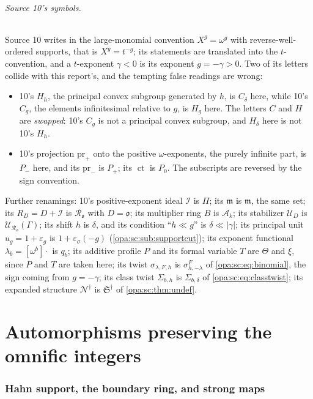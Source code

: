 \documentclass[11pt,oneside]{article}
\numberwithin{equation}{section}
\theoremstyle{definition}
\theoremstyle{remark}
\newcommand{\oo}{\mathfrak o}
\newcommand{\Ak}{\mathcal A_k}
\newcommand{\Ro}{\mathcal R_{\oo}}
\newcommand{\mm}{\mathfrak m}
\newcommand{\UU}{\mathcal U}
\newcommand{\ct}{\operatorname{ct}}
\newcommand{\bb}{\mathbin{\ll}}
\begin{document}
\paragraph{Source 10's symbols.} Source 10 writes in the large-monomial
convention $X^g=\omega^g$ with reverse-well-ordered supports, that is
$X^g=t^{-g}$; its statements are translated into the $t$-convention, and a
$t$-exponent $\gamma<0$ is its exponent $g=-\gamma>0$. Two of its letters
collide with this report's, and the tempting false readings are wrong:
\begin{itemize}[itemsep=1pt]
\item 10's $H_h$, the principal convex subgroup generated by $h$, is $C_\delta$
here, while 10's $C_g$, the elements infinitesimal relative to $g$, is $H_g$
here. The letters $C$ and $H$ are \emph{swapped}: 10's $C_g$ is not a
principal convex subgroup, and $H_\delta$ here is not 10's $H_h$.
\item 10's projection $\mathrm{pr}_+$ onto the positive $\omega$-exponents,
the purely infinite part, is $P_-$ here, and its $\mathrm{pr}_-$ is $P_+$;
its $\ct$ is $P_0$. The subscripts are reversed by the sign convention.
\end{itemize}
Further renamings: 10's positive-exponent ideal $\mathcal I$ is $\Pi$; its
$\mathfrak m$ is $\mm$, the same set; its $R_D=D+\mathcal I$ is $\Ro$ with
$D=\oo$; its multiplier ring $B$ is $\Ak$; its stabilizer $\mathcal U_D$ is
$\UU_{\Ro}(\Gamma)$; its shift $h$ is $\delta$, and its condition ``$h\ll g$''
is $\delta\bb|\gamma|$; its principal unit $u_g=1+\varepsilon_g$ is
$1+\varepsilon_\sigma(-g)$ (\cref{opa:sc:sub:supportcut}); its exponent
functional $\lambda_b=[\omega^b]\cdot$ is $q_b$; its additive profile $P$ and
its formal variable $T$ are $\Theta$ and $\xi$, since $P$ and $T$ are taken
here; its twist $\sigma_{\lambda,F,h}$ is $\sigma^F_{h,-\lambda}$ of
\eqref{opa:sc:eq:binomial}, the sign coming from $g=-\gamma$; its class
twist $\Sigma_{b,h}$ is $\Sigma_{b,\delta}$ of \eqref{opa:sc:eq:classtwist};
its expanded structure $\mathcal N^\dagger$ is $\mathfrak S^\dagger$ of
\cref{opa:sc:thm:undef}.

\part{Automorphisms preserving the omnific integers}\label{opa:part:aut}

\section{Hahn support, the boundary ring, and strong maps}\label{opa:sec:prelim}
\end{document}
